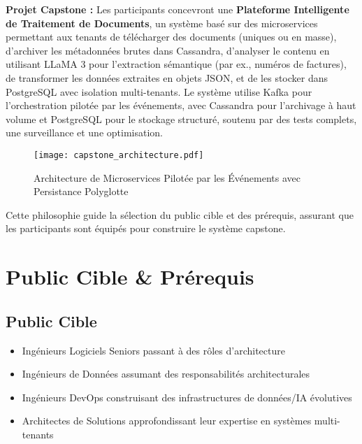 \documentclass[11pt]{article}
\begin{document}
\textbf{Projet Capstone :} Les participants concevront une \textbf{Plateforme Intelligente de Traitement de Documents}, un système basé sur des microservices permettant aux tenants de télécharger des documents (uniques ou en masse), d'archiver les métadonnées brutes dans Cassandra, d'analyser le contenu en utilisant LLaMA 3 pour l'extraction sémantique (par ex., numéros de factures), de transformer les données extraites en objets JSON, et de les stocker dans PostgreSQL avec isolation multi-tenants. Le système utilise Kafka pour l'orchestration pilotée par les événements, avec Cassandra pour l'archivage à haut volume et PostgreSQL pour le stockage structuré, soutenu par des tests complets, une surveillance et une optimisation.

\begin{figure}[h]
    \centering
    \texttt{[image: capstone\_architecture.pdf]}
    \caption{Architecture de Microservices Pilotée par les Événements avec Persistance Polyglotte}
\end{figure}

Cette philosophie guide la sélection du public cible et des prérequis, assurant que les participants sont équipés pour construire le système capstone.

\section{Public Cible \& Prérequis}

\subsection{Public Cible}
\begin{itemize}
    \item Ingénieurs Logiciels Seniors passant à des rôles d'architecture
    \item Ingénieurs de Données assumant des responsabilités architecturales
    \item Ingénieurs DevOps construisant des infrastructures de données/IA évolutives
    \item Architectes de Solutions approfondissant leur expertise en systèmes multi-tenants
\end{itemize}

\end{document}
